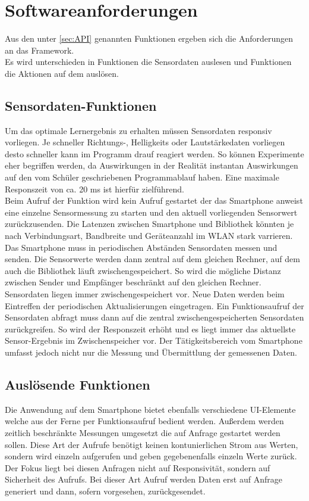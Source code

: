 \documentclass[11pt,a4paper]{report}
\begin{document}
\section*{Softwareanforderungen}\label{sec:anforderungen}
Aus den unter \ref*{sec:API} genannten Funktionen ergeben sich die Anforderungen an das Framework.
\\
Es wird unterschieden in Funktionen die Sensordaten auslesen und Funktionen die Aktionen auf dem  auslösen.
\subsection*{Sensordaten-Funktionen}
Um das optimale Lernergebnis zu erhalten müssen Sensordaten responsiv vorliegen.
Je schneller Richtungs-, Helligkeits oder Lautstärkedaten vorliegen desto schneller kann im Programm drauf reagiert werden.
So können Experimente eher begriffen werden, da Auswirkungen in der Realität instantan Auswirkungen auf den vom Schüler geschriebenen Programmablauf haben.
Eine maximale Responszeit von ca. 20 ms ist hierfür zielführend.
\\
Beim Aufruf der Funktion wird kein Aufruf gestartet der das Smartphone anweist eine einzelne Sensormessung zu starten und den aktuell vorliegenden Sensorwert zurückzusenden.
Die Latenzen zwischen Smartphone und Bibliothek könnten je nach Verbindungsart, Bandbreite und Geräteanzahl im WLAN stark varrieren.
Das Smartphone muss in periodischen Abständen Sensordaten messen und senden. Die Sensorwerte werden dann zentral auf dem gleichen Rechner, auf dem auch die Bibliothek läuft zwischengespeichert.
So wird die mögliche Distanz zwischen Sender und Empfänger beschränkt auf den gleichen Rechner.
Sensordaten liegen immer zwischengespeichert vor.
Neue Daten werden beim Eintreffen der periodischen Aktualisierungen eingetragen.
Ein Funktionsaufruf der Sensordaten abfragt muss dann auf die zentral zwischengespeicherten Sensordaten zurückgreifen.
So wird der Responszeit erhöht und es liegt immer das aktuellste Sensor-Ergebnis im Zwischenspeicher vor.
Der Tätigkeitsbereich vom Smartphone umfasst jedoch nicht nur die Messung und Übermittlung der gemessenen Daten.

\subsection*{Auslösende Funktionen}
Die Anwendung auf dem Smartphone bietet ebenfalls verschiedene UI-Elemente welche aus der Ferne per Funktionsaufruf bedient werden.
Außerdem werden zeitlich beschränkte Messungen umgesetzt die auf Anfrage gestartet werden sollen.
Diese Art der Aufrufe benötigt keinen kontunierlichen Strom aus Werten, sondern wird einzeln aufgerufen und geben gegebenenfalls einzeln Werte zurück.
Der Fokus liegt bei diesen Anfragen nicht auf Responsivität, sondern auf Sicherheit des Aufrufs.
Bei dieser Art Aufruf werden Daten erst auf Anfrage generiert und dann, sofern vorgesehen, zurückgesendet.
\end{document}

